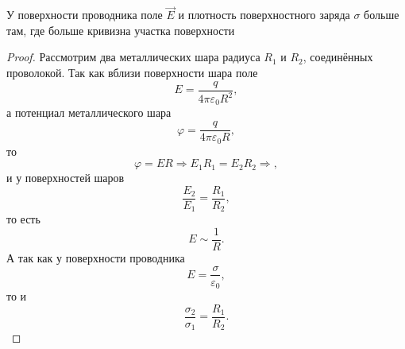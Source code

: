     \begin{proposition}
        У поверхности проводника поле \( \vec{E} \) и плотность поверхностного
        заряда \( \sigma \) больше там, где больше кривизна участка поверхности
    \end{proposition}

    \begin{proof}
        Рассмотрим два металлических шара радиуса \( R_1 \) и \( R_2 \), 
        соединённых проволокой. Так как вблизи поверхности шара поле
        \[
            E = \frac{q}{4\pi\varepsilon_0 R^2},
        \]
        а потенциал металлического шара
        \[
            \varphi = \frac{q}{4\pi\varepsilon_0 R},
        \]
        то
        \[
            \varphi = ER \Rightarrow E_1 R_1 = E_2 R_2 \Rightarrow,
        \]
        и у поверхностей шаров
        \[
            \frac{E_2}{E_1} = \frac{R_1}{R_2},
        \]
        то есть
        \[
            E \sim \frac{1}{R}.
        \]
        А так как у поверхности проводника
        \[
            E = \frac{\sigma}{\varepsilon_0},
        \]
        то и
        \[
            \frac{\sigma_2}{\sigma_1} = \frac{R_1}{R_2}.
        \]
    \end{proof}

